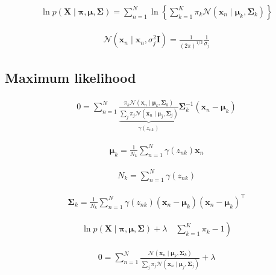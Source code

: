 \documentclass{article}
\begin{document}
\begin{align*}
\ln p(\mathbf{X} \mid \boldsymbol{\pi}, \boldsymbol{\mu}, \boldsymbol{\Sigma})=\sum_{n=1}^{N} \ln \left\{\sum_{k=1}^{K} \pi_{k} \mathcal{N}\left(\mathbf{x}_{n} \mid \boldsymbol{\mu}_{k}, \boldsymbol{\Sigma}_{k}\right)\right\}
\tag{15.13}
\end{align*}

\begin{align*}
\mathcal{N}\left(\mathbf{x}_{n} \mid \mathbf{x}_{n}, \sigma_{j}^{2} \mathbf{I}\right)=\frac{1}{(2 \pi)^{1 / 2}} \frac{1}{\sigma_{j}}
\tag{15.14}
\end{align*}

\subsection{Maximum likelihood}

\begin{align*}
0=\sum_{n=1}^{N} \underbrace{\frac{\pi_{k} \mathcal{N}\left(\mathbf{x}_{n} \mid \boldsymbol{\mu}_{k}, \boldsymbol{\Sigma}_{k}\right)}{\sum_{j} \pi_{j} \mathcal{N}\left(\mathbf{x}_{n} \mid \boldsymbol{\mu}_{j}, \boldsymbol{\Sigma}_{j}\right)}}_{\gamma\left(z_{n k}\right)} \boldsymbol{\Sigma}_{k}^{-1}\left(\mathbf{x}_{n}-\boldsymbol{\mu}_{k}\right)
\tag{15.15}
\end{align*}

\begin{align*}
\boldsymbol{\mu}_{k}=\frac{1}{N_{k}} \sum_{n=1}^{N} \gamma\left(z_{n k}\right) \mathbf{x}_{n}
\tag{15.16}
\end{align*}

\begin{align*}
N_{k}=\sum_{n=1}^{N} \gamma\left(z_{n k}\right)
\tag{15.17}
\end{align*}

\begin{align*}
\boldsymbol{\Sigma}_{k}=\frac{1}{N_{k}} \sum_{n=1}^{N} \gamma\left(z_{n k}\right)\left(\mathbf{x}_{n}-\boldsymbol{\mu}_{k}\right)\left(\mathbf{x}_{n}-\boldsymbol{\mu}_{k}\right)^{\top}
\tag{15.18}
\end{align*}

\begin{align*}
\left.\ln p(\mathbf{X} \mid \boldsymbol{\pi}, \boldsymbol{\mu}, \boldsymbol{\Sigma})+\lambda \quad \sum_{k=1}^{K} \pi_{k}-1\right)
\tag{15.19}
\end{align*}

\begin{align*}
0=\sum_{n=1}^{N} \frac{\mathcal{N}\left(\mathbf{x}_{n} \mid \boldsymbol{\mu}_{k}, \boldsymbol{\Sigma}_{k}\right)}{\sum_{j} \pi_{j} \mathcal{N}\left(\mathbf{x}_{n} \mid \boldsymbol{\mu}_{j}, \boldsymbol{\Sigma}_{j}\right)}+\lambda
\tag{15.20}
\end{align*}
\end{document}
